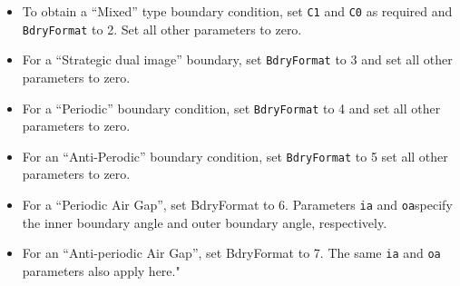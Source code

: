 \begin{itemize}
\begin{itemize}
        \item To obtain a ``Mixed'' type boundary condition, set {\tt C1} and
        {\tt C0} as required and {\tt BdryFormat} to 2.  Set all other
        parameters to zero.

        \item For a ``Strategic dual image'' boundary, set {\tt BdryFormat} to 3
        and set all other parameters to zero.

        \item For a ``Periodic'' boundary condition, set {\tt BdryFormat} to 4 and
        set all other parameters to zero.

        \item For an ``Anti-Perodic'' boundary condition, set {\tt BdryFormat} to
        5 set all other parameters to zero.
        
        \item  For a ``Periodic Air Gap'', set BdryFormat to 6. Parameters {\tt ia} and {\tt oa}specify the inner boundary angle and outer boundary angle, respectively.

        \item  For an ``Anti-periodic Air Gap'', set BdryFormat to 7.  The same  {\tt ia} and {\tt oa} parameters also apply here."

        \end{itemize}


\end{itemize}
